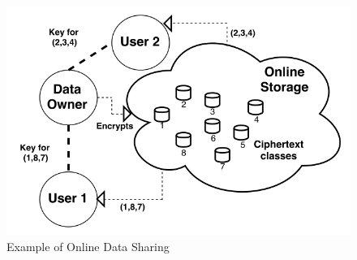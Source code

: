  
 \begin{figure}[!t]
\centering
\captionsetup{font=scriptsize}
\includegraphics[scale=0.25]{Figs/KeyAgg.png}
\caption{Example of Online Data Sharing}
\label{fig:intro}
\end{figure}


% 



